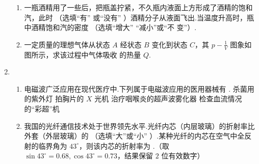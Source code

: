 \begin{enumerate}
\begin{enumerate}
\item 
一瓶酒精用了一些后，把瓶盖拧紧，不久瓶内液面上方形成了酒精的饱和汽，此时 \underlinegap （选填“有”
或“没有”
）酒精分子从液面飞出.当温度升高时，瓶中酒精饱和汽的密度 \underlinegap （选填“增大”
“减小”或“不
变”）.






\item 
一定质量的理想气体从状态 $ A $ 经状态 $ B $ 变化到状态 $ C $，其 $ p-\frac{1}{V} $
图象如图所示，求该过程中气体吸收
的热量 $ Q $.
\begin{figure}[h!]
\flushright

\end{figure}






\end{enumerate}







\item 

\begin{enumerate}
\item
电磁波广泛应用在现代医疗中.下列属于电磁波应用的医用器械有 \underlinegap .
\fourchoices
{杀菌用的紫外灯}
{拍胸片的 $ X $ 光机}
{治疗咽喉炎的超声波雾化器}
{检查血流情况的“彩超”机}






\item 
我国的光纤通信技术处于世界领先水平.光纤内芯（内层玻璃）的折射率比外套（外层玻璃）的
\underlinegap （选填“大”或“小”
）.某种光纤的内芯在空气中全反射的临界角为 $ 43 ^{ \circ } $，则该内芯的折射率为 \underlinegap .（取
$ \sin 43 ^{ \circ } =0.68, \cos 43 ^{ \circ } =0.73 $，结果保留 $ 2 $ 位有效数字）



\end{enumerate}
\end{enumerate}
